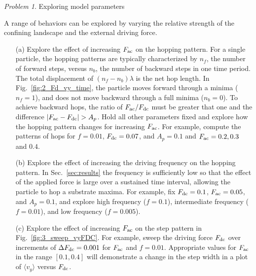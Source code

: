 \documentclass[preprint,showpacs,preprintnumbers,amsmath,amssymb,aps,prb]{revtex4-1}
\theoremstyle{remark}
\newtheorem{problem}{Problem}
\begin{document}
\medskip \begin{problem}{Exploring model parameters}
\label{ex:parameters}

\noindent A range of  behaviors
can be explored by varying the
  relative strength of the confining landscape
  and the external driving force.

\begin{enumerate}

\item[(a)]
  Explore the effect of increasing $F_{\rm ac}$ on the hopping pattern.
  For a single  particle,
  the hopping patterns are typically characterized
  by $n_f$, the number of forward steps,
  versus $n_b$, the number of backward steps  in one
  time period.
  The total displacement of $(n_f - n_b) \lambda$ 
  is the net hop length.  
  In Fig.~\ref{fig:2_Fd_vy_time},
  the particle moves forward through a minima ($n_f = 1$),
  and does not move backward through a full minima ($n_b = 0$).  
  To achieve
  backward hops,
  the  ratio of $F_{\rm ac}/F_{\rm dc}$ must be greater that one  
  and the difference $|F_{\rm ac} - F_{\rm dc}| > A_p$.
  Hold all other parameters fixed and %
  explore how the hopping pattern
  changes for increasing $F_{\rm ac}$.
  For example,
  compute the patterns of hops for  
  $f=0.01$, $F_{\rm dc}=0.07$, and $A_p = 0.1$
  and
  $F_{\rm ac} = 0.2, 0.3$ and $0.4$.
  
\item[(b)] Explore the effect of increasing the driving frequency on the hopping pattern. In Sec.~\ref{sec:results}
  the frequency is sufficiently low so that the effect of 
  the applied force is large
  over a sustained time interval,
  allowing the particle to hop a substrate maxima.
  For example, fix 
  $F_{\rm dc}=0.1$, $F_{\rm ac}=0.05$, and $A_p = 0.1$,
  and explore
  high frequency 
  ($f = 0.1$),
  intermediate frequency 
  ($f = 0.01$),
  and low frequency
  ($f = 0.005$).
 
\item[(c)] Explore the effect of increasing  $F_{\rm ac}$ on the step pattern in Fig.~\ref{fig:3_sweep_vyFDC}.
  For example, sweep the driving force $F_{\rm dc}$
  over increments of $\Delta F_{\rm dc} = 0.001$
  for    $F_{\rm ac}$ and  $f=0.01$.
  Appropriate values for 
  $F_{\rm ac}$ in the range $[0.1, 0.4]$
  will demonstrate a change in the step width
  in a plot of $\langle v_y \rangle$ versus $F_{\rm dc}$.
  
  \end{enumerate}
  \end{problem}
  
\end{document}
